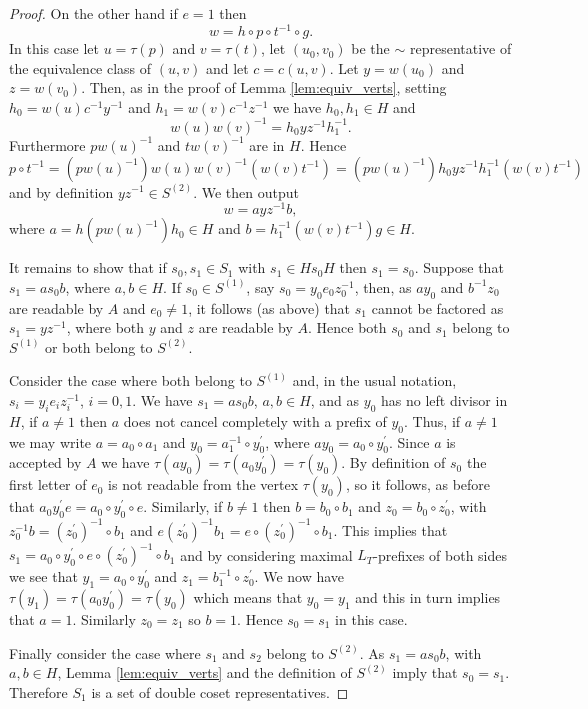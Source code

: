 \documentclass[a4paper,12pt]{article}
\renewcommand{\t}{\tau }
\numberwithin{equation}{section}
\numberwithin{figure}{section}
\begin{document}
\begin{proof}
On the other hand if $e=1$ then
\[w=h\circ p\circ t^{-1}\circ g.\]
In this case let $u=\t(p)$ and $v=\t(t)$,
let $(u_0,v_0)$ be the $\sim$ representative
of the equivalence class of $(u,v)$ and let $c=c(u,v)$.
Let $y=w(u_0)$ and $z=w(v_0)$. Then,  as in the proof of Lemma
\ref{lem:equiv_verts}, setting $h_0=w(u)c^{-1}y^{-1}$ and
$h_1=w(v)c^{-1}z^{-1}$ we have
 $h_0,h_1\in H$ and
\[w(u)w(v)^{-1}=h_0yz^{-1}h_1^{-1}.\] Furthermore
 $p w(u)^{-1}$ and  $t w(v)^{-1}$ are in $H$. Hence
\[
p\circ t^{-1}=( p w(u)^{-1})w(u)w(v)^{-1}( w(v)t^{-1})=( p w(u)^{-1}) h_0 yz^{-1}
h_1^{-1}( w(v)t^{-1})
\]
and by definition $yz^{-1}\in S^{(2)}$. We then output
\[w=a yz^{-1} b,\]
where $a=h ( p w(u)^{-1}) h_0\in H$ and $b=h_1^{-1}( w(v)t^{-1})g \in H$.

It remains to show that if $s_0,s_1\in S_1$ with $s_1\in Hs_0H$
then $s_1=s_0$. Suppose that $s_1=as_0b$, where $a, b\in H$. If
$s_0\in S^{(1)}$, say $s_0=y_0e_0z_0^{-1}$, then, as $ay_0$ and
$b^{-1}z_0$ are readable by $A$ and $e_0\neq 1$, it follows (as
above) that $s_1$ cannot be factored as $s_1=yz^{-1}$, where both
$y$ and $z$ are readable by $A$. Hence both $s_0$ and $s_1$ belong
to $S^{(1)}$ or both belong to $S^{(2)}$.

Consider the case where both belong to $S^{(1)}$ and, in the usual notation,
$s_i=y_i e_i z_i^{-1}$, $i=0,1$. We have $s_1=as_0b$, $a,b\in H$, and as $y_0$ has
no left divisor in $H$, if $a\neq 1$ then $a$ does not cancel completely with
 a prefix of $y_0$. Thus, if $a\neq 1$ we may write $a=a_0\circ a_1$ and
$y_0=a_1^{-1}\circ y_0^\prime$, where $ay_0=a_0\circ y_0^\prime$. Since
$a$ is accepted by $A$ we have $\t(ay_0)=\t(a_0y_0^\prime)=\t(y_0)$. By definition
of $s_0$ the first letter of $e_0$ is not readable from the vertex $\t(y_0)$, so
it follows, as before that $a_0y_0^\prime e=a_0\circ y_0^\prime \circ e$. Similarly,
if $b\neq 1$ then $b=b_0\circ b_1$ and $z_0=b_0\circ z_0^\prime$, with
$z_0^{-1}b= (z_0^\prime)^{-1}\circ b_1$ and $e (z_0^\prime)^{-1}b_1=
e\circ  (z_0^\prime)^{-1}\circ b_1$. This implies that
$s_1=a_0\circ y_0^\prime \circ  e\circ  (z_0^\prime)^{-1}\circ b_1$ and by considering
maximal $L_T$-prefixes of both sides we see that $y_1=a_0\circ y_0^\prime$ and
$z_1=b_1^{-1}\circ z_0^\prime$. We now have  $\t(y_1)=\t(a_0y_0^\prime)=\t(y_0)$ which
 means that
$y_0=y_1$ and this in turn implies that $a=1$. Similarly $z_0=z_1$ so $b=1$.
Hence $s_0=s_1$ in this case.

Finally consider the case where $s_1$ and $s_2$ belong to
$S^{(2)}$. As $s_1=as_0b$, with $a,b\in H$, Lemma
\ref{lem:equiv_verts} and the definition of $S^{(2)}$ imply  that
$s_0= s_1$. Therefore $S_1$ is a set of double coset
representatives.
\end{proof}
\end{document}
